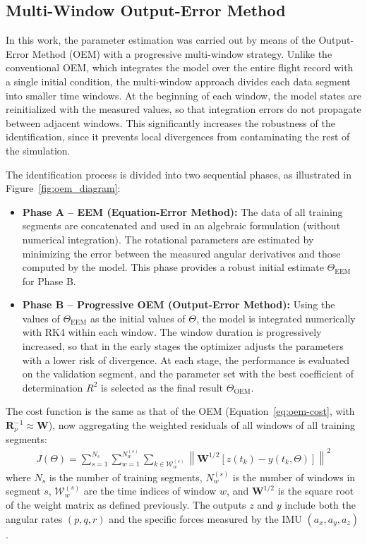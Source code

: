 \documentclass{ieeeaccess}
\begin{document}
\subsection{Multi-Window Output-Error Method}

In this work, the parameter estimation was carried out by means of the Output-Error Method (OEM) with a progressive multi-window strategy. Unlike the conventional OEM, which integrates the model over the entire flight record with a single initial condition, the multi-window approach divides each data segment into smaller time windows. At the beginning of each window, the model states are reinitialized with the measured values, so that integration errors do not propagate between adjacent windows. This significantly increases the robustness of the identification, since it prevents local divergences from contaminating the rest of the simulation.

The identification process is divided into two sequential phases, as illustrated in Figure~\ref{fig:oem_diagram}:

\begin{itemize}
    \item \textbf{Phase A -- EEM (Equation-Error Method):} The data of all training segments are concatenated and used in an algebraic formulation (without numerical integration). The rotational parameters are estimated by minimizing the error between the measured angular derivatives and those computed by the model. This phase provides a robust initial estimate $\Theta_{\text{EEM}}$ for Phase B.
    \item \textbf{Phase B -- Progressive OEM (Output-Error Method):} Using the values of $\Theta_{\text{EEM}}$ as the initial values of $\Theta$, the model is integrated numerically with RK4 within each window. The window duration is progressively increased, so that in the early stages the optimizer adjusts the parameters with a lower risk of divergence. At each stage, the performance is evaluated on the validation segment, and the parameter set with the best coefficient of determination $R^2$ is selected as the final result $\Theta_{\text{OEM}}$.
\end{itemize}

The cost function is the same as that of the OEM (Equation~\eqref{eq:oem-cost}, with $\mathbf{R}_\nu^{-1} \approx \mathbf{W}$), now aggregating the weighted residuals of all windows of all training segments:
\begin{align}
J(\Theta) = \sum_{s=1}^{N_s} \sum_{w=1}^{N_w^{(s)}} \sum_{k \in \mathcal{W}_w^{(s)}} \left\| \mathbf{W}^{1/2} \left[ z(t_k) - y(t_k, \Theta) \right] \right\|^2
\end{align}
where $N_s$ is the number of training segments, $N_w^{(s)}$ is the number of windows in segment $s$, $\mathcal{W}_w^{(s)}$ are the time indices of window $w$, and $\mathbf{W}^{1/2}$ is the square root of the weight matrix as defined previously. The outputs $z$ and $y$ include both the angular rates $(p, q, r)$ and the specific forces measured by the IMU $(a_x, a_y, a_z)$.
\end{document}
